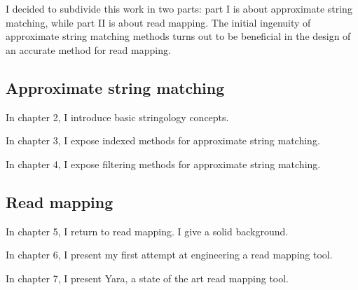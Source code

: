 
I decided to subdivide this work in two parts: part I is about approximate string matching, while part II is about read mapping.
The initial ingenuity of approximate string matching methods turns out to be beneficial in the design of an accurate method for read mapping.

\subsection{Approximate string matching}

In chapter 2, I introduce basic stringology concepts. 

In chapter 3, I expose indexed methods for approximate string matching.

In chapter 4, I expose filtering methods for approximate string matching.

\subsection{Read mapping}

In chapter 5, I return to read mapping. I give a solid background.

In chapter 6, I present my first attempt at engineering a read mapping tool.

In chapter 7, I present Yara, a state of the art read mapping tool.

